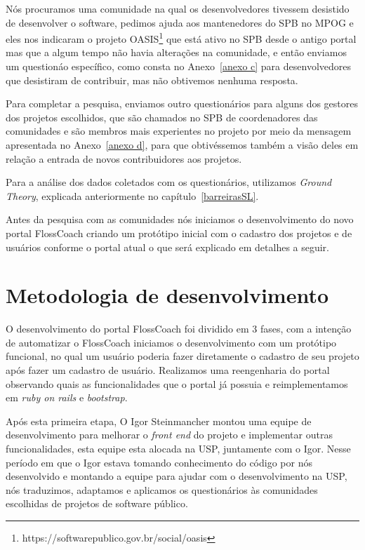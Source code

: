 Nós procuramos uma comunidade na qual os desenvolvedores tivessem desistido
de desenvolver o software, pedimos ajuda aos mantenedores do SPB no MPOG e eles nos 
indicaram o projeto OASIS\footnote{https://softwarepublico.gov.br/social/oasis} que 
está ativo no SPB desde o antigo portal mas que a algum tempo não havia alterações
na comunidade, e então enviamos um questionáo específico, como consta no Anexo~\ref{anexo c} 
para desenvolvedores que desistiram de contribuir, mas não obtivemos nenhuma resposta. 

Para completar a pesquisa, enviamos outro questionários para alguns dos gestores dos
projetos escolhidos, que são chamados no SPB de coordenadores das comunidades e 
são membros mais experientes no projeto por meio da mensagem apresentada no Anexo~\ref{anexo d}, 
para que obtivéssemos também a visão deles em relação a entrada de novos contribuidores aos projetos. 

Para a análise dos dados coletados com os questionários, utilizamos \textit{Ground Theory}, 
explicada anteriormente no capítulo~\ref{barreirasSL}.

Antes da pesquisa com as comunidades nós iniciamos o desenvolvimento do novo portal
FlossCoach criando um protótipo inicial com o cadastro dos projetos e de usuários 
conforme o portal atual o que será explicado em detalhes a seguir. 

\section{Metodologia de desenvolvimento}

O desenvolvimento do portal FlossCoach foi dividido em 3 fases, com a intenção de 
automatizar o FlossCoach iniciamos o desenvolvimento com um protótipo funcional, no qual 
um usuário poderia fazer diretamente o cadastro de seu projeto após fazer um cadastro de 
usuário. Realizamos uma reengenharia do portal observando quais as funcionalidades 
que o portal já possuia e reimplementamos em \textit{ruby on rails} e \textit{bootstrap}.

Após esta primeira etapa, O Igor Steinmancher montou uma equipe de desenvolvimento 
para melhorar o \textit{front end} do projeto e implementar outras funcionalidades, 
esta equipe esta alocada na USP, juntamente com o Igor. Nesse período em que o Igor 
estava tomando conhecimento do código por nós desenvolvido e montando a equipe para
ajudar com o desenvolvimento na USP, nós traduzimos, adaptamos e aplicamos os questionários
às comunidades escolhidas de projetos de software público.

